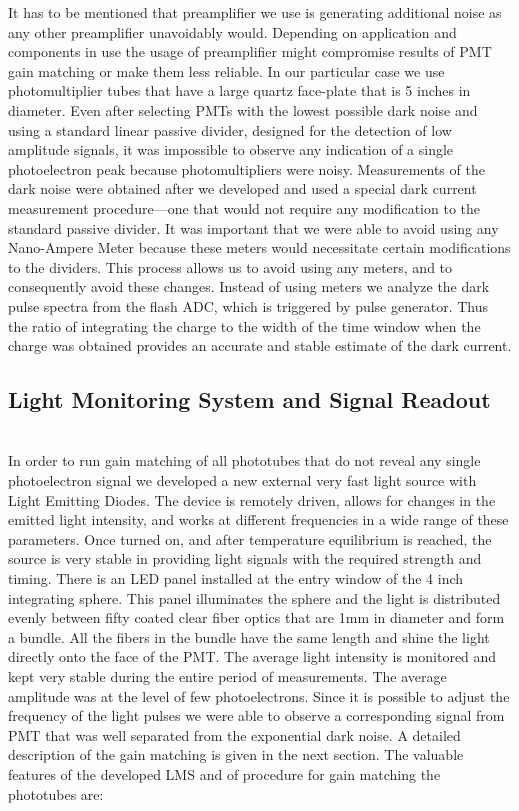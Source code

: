 \indent It has to be mentioned that preamplifier we use is generating additional noise as any other preamplifier unavoidably would. Depending on application and components in use the usage of preamplifier might compromise results of PMT gain matching or make them less reliable. In our particular case we use photomultiplier tubes that have a large quartz face-plate that is 5 inches in diameter. Even after selecting PMTs with the lowest possible dark noise and using a standard linear passive divider, designed for the detection of low amplitude signals, it was impossible to observe any indication of a single photoelectron peak because photomultipliers were noisy. Measurements of the dark noise were obtained after we developed and used a special dark current measurement procedure---one that would not require any modification to the standard passive divider. It was important that we were able to avoid using any Nano-Ampere Meter because these meters would necessitate certain modifications to the dividers. This process allows us to avoid using any meters, and to consequently avoid these changes. Instead of using meters we analyze the dark pulse spectra from the flash ADC, which is triggered by pulse generator. Thus the ratio of integrating the charge to the width of the time window when the charge was obtained provides an accurate and stable estimate of the dark current. 

\subsection{Light Monitoring System and Signal Readout}
\indent
 \\
 \indent In order to run gain matching of all phototubes that do not reveal any single photoelectron signal we developed a new external very fast light source with Light Emitting Diodes. The device is remotely driven, allows for changes in the emitted light intensity, and works at different frequencies in a wide range of these parameters. Once turned on, and after temperature equilibrium is reached, the source is very stable in providing light signals with the required strength and timing. There is an LED panel installed at the entry window of the 4 inch integrating sphere. This panel illuminates the sphere and the light is distributed evenly between fifty coated clear fiber optics that are 1mm in diameter and form a bundle. All the fibers in the bundle have the same length and shine the light directly onto the face of the PMT. The average light intensity is monitored and kept very stable during the entire period of measurements. The average amplitude was at the level of few photoelectrons. Since it is possible to adjust the frequency of the light pulses we were able to observe a corresponding signal from PMT that was well separated from the exponential dark noise. A detailed description of the gain matching is given in the next section. The valuable features of the developed LMS and of procedure for gain matching the phototubes are:
 
